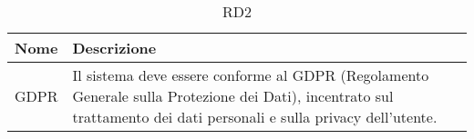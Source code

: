 \documentclass{natourDoc}
\begin{document}
	\begin{table}[H]
		\centering
		\begin{tabular}{ |p{5cm}|p{10.3cm}| }
			\hline
			\rowcolor{PineGreen!70}
			\textbf{Nome} & \textbf{Descrizione} \\
			\hline
			GDPR & Il sistema deve essere conforme al GDPR (Regolamento Generale sulla Protezione dei Dati), 
			incentrato sul trattamento dei dati personali e sulla privacy dell’utente.  \\
			\hline
		\end{tabular}
		\caption{RD2}
		\label{table:27}
	\end{table}
\end{document}

